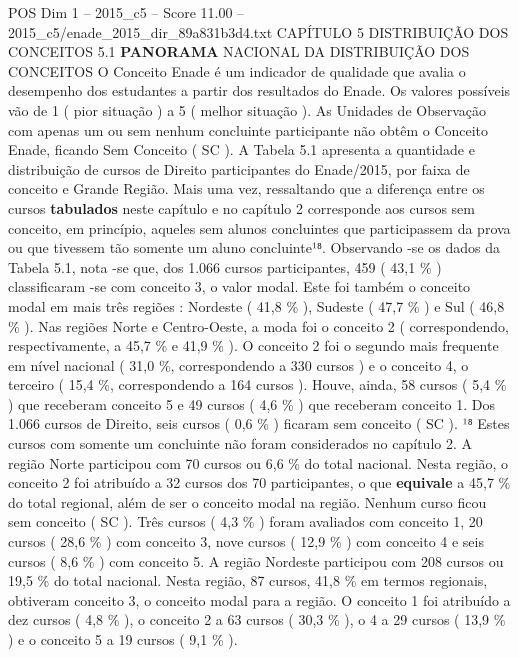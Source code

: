 \begin{textsample}{POS Dim 1 – 2015\_c5 – Score 11.00 – 2015\_c5/enade\_2015\_dir\_89a831b3d4.txt}  \label{ex:f1_pos_091}
CAPÍTULO 5 DISTRIBUIÇÃO DOS CONCEITOS 5.1 \textbf{PANORAMA} NACIONAL DA DISTRIBUIÇÃO DOS CONCEITOS O Conceito Enade é um indicador de qualidade que avalia o desempenho dos estudantes a partir dos resultados do Enade.
Os valores possíveis vão de 1 ( pior situação ) a 5 ( melhor situação ).
As Unidades de Observação com apenas um ou sem nenhum concluinte participante não obtêm o Conceito Enade, ficando Sem Conceito ( SC ).
A Tabela 5.1 apresenta a quantidade e distribuição de cursos de Direito participantes do Enade/2015, por faixa de conceito e Grande Região.
Mais uma vez, ressaltando que a diferença entre os cursos \textbf{tabulados} neste capítulo e no capítulo 2 corresponde aos cursos sem conceito, em princípio, aqueles sem alunos concluintes que participassem da prova ou que tivessem tão somente um aluno concluinte¹⁸.
Observando -se os dados da Tabela 5.1, nota -se que, dos 1.066 cursos participantes, 459 ( 43,1 \% ) classificaram -se com conceito 3, o valor modal.
Este foi também o conceito modal em mais três regiões : Nordeste ( 41,8 \% ), Sudeste ( 47,7 \% ) e Sul ( 46,8 \% ).
Nas regiões Norte e Centro-Oeste, a moda foi o conceito 2 ( correspondendo, respectivamente, a 45,7 \% e 41,9 \% ).
O conceito 2 foi o segundo mais frequente em nível nacional ( 31,0 \%, correspondendo a 330 cursos ) e o conceito 4, o terceiro ( 15,4 \%, correspondendo a 164 cursos ).
Houve, ainda, 58 cursos ( 5,4 \% ) que receberam conceito 5 e 49 cursos ( 4,6 \% ) que receberam conceito 1.
Dos 1.066 cursos de Direito, seis cursos ( 0,6 \% ) ficaram sem conceito ( SC ). ¹⁸ Estes cursos com somente um concluinte não foram considerados no capítulo 2.
A região Norte participou com 70 cursos ou 6,6 \% do total nacional.
Nesta região, o conceito 2 foi atribuído a 32 cursos dos 70 participantes, o que \textbf{equivale} a 45,7 \% do total regional, além de ser o conceito modal na região.
Nenhum curso ficou sem conceito ( SC ).
Três cursos ( 4,3 \% ) foram avaliados com conceito 1, 20 cursos ( 28,6 \% ) com conceito 3, nove cursos ( 12,9 \% ) com conceito 4 e seis cursos ( 8,6 \% ) com conceito 5.
A região Nordeste participou com 208 cursos ou 19,5 \% do total nacional.
Nesta região, 87 cursos, 41,8 \% em termos regionais, obtiveram conceito 3, o conceito modal para a região.
O conceito 1 foi atribuído a dez cursos ( 4,8 \% ), o conceito 2 a 63 cursos ( 30,3 \% ), o 4 a 29 cursos ( 13,9 \% ) e o conceito 5 a 19 cursos ( 9,1 \% ).

\end{textsample}
